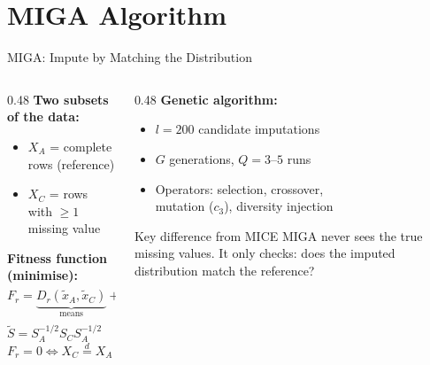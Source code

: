 \documentclass[aspectratio=169,12pt]{beamer}
\begin{document}
\section{MIGA Algorithm}

\begin{frame}{MIGA: Impute by Matching the Distribution}

\begin{columns}
\begin{column}{0.48\textwidth}
\textbf{Two subsets of the data:}
\begin{itemize}
  \item $X_A$ = complete rows (reference)
  \item $X_C$ = rows with $\geq 1$ missing value
\end{itemize}

\bigskip
\textbf{Fitness function (minimise):}
\[
F_r = \underbrace{D_r(\tilde{x}_A, \tilde{x}_C)}_{\text{means}} +
      \underbrace{D_r(\tilde{S}, I)}_{\text{covariance}} +
      \underbrace{D_r(b_A, b_C)}_{\text{skewness}}
\]
$\tilde{S} = S_A^{-1/2} S_C S_A^{-1/2}$ \\[3pt]
$F_r = 0 \Leftrightarrow X_C \overset{d}{=} X_A$
\end{column}

\begin{column}{0.48\textwidth}
\textbf{Genetic algorithm:}
\begin{itemize}
  \item $l = 200$ candidate imputations
  \item $G$ generations, $Q = 3$--$5$ runs
  \item Operators: selection, crossover, \\
        mutation ($c_3$), diversity injection
\end{itemize}

\bigskip
\begin{alertblock}{Key difference from MICE}
MIGA never sees the true missing values.
It only checks: does the imputed distribution match the reference?
\end{alertblock}
\end{column}
\end{columns}

\end{frame}

\end{document}

